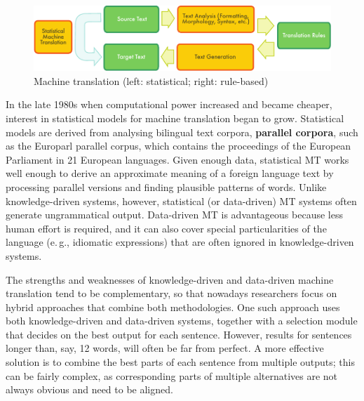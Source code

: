 \begin{multicols}{2}
  \begin{figure}[htb]
    \center
    \includegraphics[width=\textwidth]{../_media/english/machine_translation}
    \caption{Machine translation (left: statistical; right: rule-based)}
    \label{fig:mtarch_en}
  \end{figure}

  In the late 1980s when computational power increased and became cheaper, interest in statistical models for machine translation began to grow. Statistical models are derived from analysing bilingual text corpora, \textbf{parallel corpora}, such as the Europarl parallel corpus, which contains the proceedings of the European Parliament in 21 European languages. Given enough data, statistical MT works well enough to derive an approximate meaning of a foreign language text by processing parallel versions and finding plausible patterns of words. Unlike knowledge-driven systems, however, statistical (or data-driven) MT systems often generate ungrammatical output. Data-driven MT is advantageous because less human effort is required, and it can also cover special particularities of the language (e.\,g., idiomatic expressions) that are often ignored in knowledge-driven systems. 

  The strengths and weaknesses of knowledge-driven and data-driven machine translation tend to be complementary, so that nowadays researchers focus on hybrid approaches that combine both methodologies. One such approach uses both knowledge-driven and data-driven systems, together with a selection module that decides on the best output for each sentence. However, results for sentences longer than, say, 12 words, will often be far from perfect. A more effective solution is to combine the best parts of each sentence from multiple outputs; this can be fairly complex, as corresponding parts of multiple alternatives are not always obvious and need to be aligned. 



\end{multicols}
